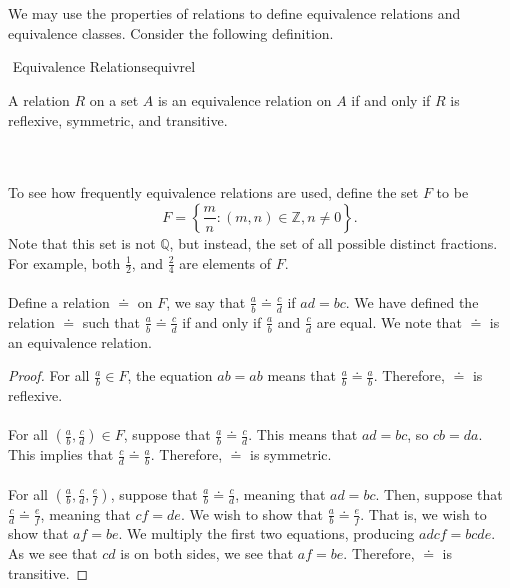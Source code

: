         \vphantom
        \\
        \\
        We may use the properties of relations to define equivalence relations and equivalence classes. Consider the following definition.
        \begin{definition}{\Stop\,\,Equivalence Relations}{equivrel}
        
            A relation \(R\) on a set \(A\) is an equivalence relation on \(A\) if and only if \(R\) is reflexive, symmetric, and transitive.
        
        \end{definition}
        \pagebreak
        \vphantom
        \\
        \\
        To see how frequently equivalence relations are used, define the set \(F\) to be
       \begin{equation*}
           F=\left\{\frac{m}{n}:(m,n)\in\mathbb{Z},n\neq0\right\}.
       \end{equation*}
        Note that this set is not \(\mathbb{Q}\), but instead, the set of all possible distinct fractions. For example, both \(\frac{1}{2}\), and \(\frac{2}{4}\) are elements of \(F\).
        \\
        \\
        Define a relation \(\doteq\) on \(F\), we say that \(\frac{a}{b}\doteq\frac{c}{d}\) if \(ad=bc\). We have defined the relation \(\doteq\) such that \(\frac{a}{b}\doteq\frac{c}{d}\) if and only if \(\frac{a}{b}\) and \(\frac{c}{d}\) are equal. We note that \(\doteq\) is an equivalence relation. 
        \begin{proof}
            For all \(\frac{a}{b}\in F\), the equation \(ab=ab\) means that \(\frac{a}{b}\doteq\frac{a}{b}\). Therefore, \(\doteq\) is reflexive.
            \\
            \\
            For all \(\left(\frac{a}{b},\frac{c}{d}\right)\in F\), suppose that \(\frac{a}{b}\doteq\frac{c}{d}\). This means that \(ad=bc\), so \(cb=da\). This implies that \(\frac{c}{d}\doteq\frac{a}{b}\). Therefore, \(\doteq\) is symmetric.
            \\
            \\
            For all \(\left(\frac{a}{b},\frac{c}{d},\frac{e}{f}\right)\), suppose that \(\frac{a}{b}\doteq\frac{c}{d}\), meaning that \(ad=bc\). Then, suppose that \(\frac{c}{d}\doteq\frac{e}{f}\), meaning that \(cf=de\). We wish to show that \(\frac{a}{b}\doteq\frac{e}{f}\). That is, we wish to show that \(af=be\). We multiply the first two equations, producing \(adcf=bcde\). As we see that \(cd\) is on both sides, we see that \(af=be\). Therefore, \(\doteq\) is transitive.
        \end{proof}
